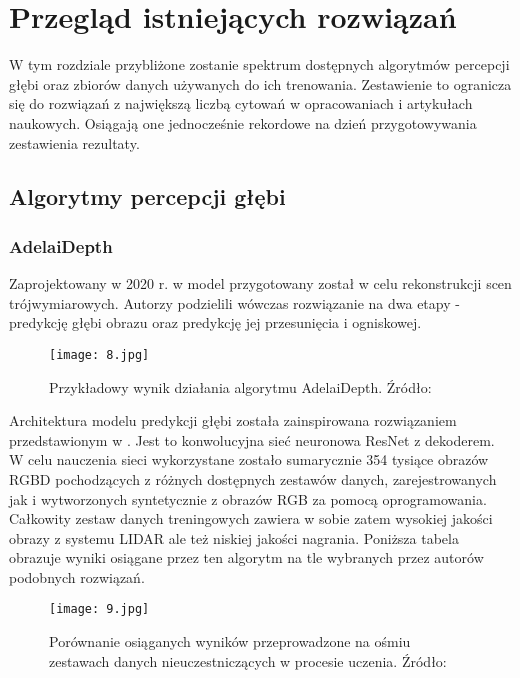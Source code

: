 \chapter{Przegląd istniejących rozwiązań}\label{chap:3_przegląd_istniejących_rozwiązań}

W tym rozdziale przybliżone zostanie spektrum dostępnych algorytmów percepcji głębi oraz zbiorów danych używanych do ich trenowania. Zestawienie to ogranicza się do rozwiązań z największą liczbą cytowań w opracowaniach i artykułach naukowych. Osiągają one jednocześnie rekordowe na dzień przygotowywania zestawienia rezultaty.

\section{Algorytmy percepcji głębi}
\subsection{AdelaiDepth}
Zaprojektowany w 2020 r. w \cite{yin2020} model przygotowany został w celu rekonstrukcji scen trójwymiarowych. Autorzy podzielili wówczas rozwiązanie na dwa etapy - predykcję głębi obrazu oraz predykcję jej przesunięcia i ogniskowej.
\begin{figure}[H]
    \centering
    \texttt{[image: 8.jpg]}
    \caption{Przykładowy wynik działania algorytmu AdelaiDepth. Źródło: \cite{yin2020}}
    \label{fig:adelaidepth}
\end{figure}
Architektura modelu predykcji głębi została zainspirowana rozwiązaniem przedstawionym w \cite{xian2020}. Jest to konwolucyjna sieć neuronowa ResNet \cite{he2015} z dekoderem. W celu nauczenia sieci wykorzystane zostało sumarycznie 354 tysiące obrazów RGBD pochodzących z różnych dostępnych zestawów danych, zarejestrowanych jak i wytworzonych syntetycznie z obrazów RGB za pomocą oprogramowania. Całkowity zestaw danych treningowych zawiera w sobie zatem  wysokiej jakości obrazy z systemu LIDAR ale też niskiej jakości nagrania. Poniższa tabela obrazuje wyniki osiągane przez ten algorytm na tle wybranych przez autorów podobnych rozwiązań.
\begin{figure}[H]
    \centering
    \texttt{[image: 9.jpg]}
    \caption{Porównanie osiąganych wyników przeprowadzone na ośmiu zestawach danych nieuczestniczących w procesie uczenia. Źródło: \cite{yin2020}}
    \label{fig:adelaidepth-results}
\end{figure}

